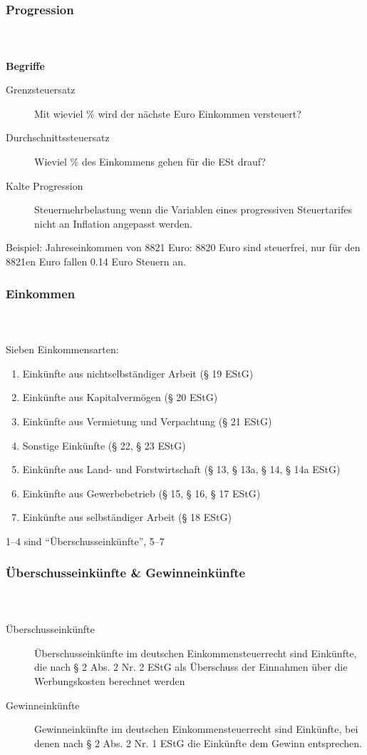 \documentclass[ngerman]{beamer}
\begin{document}
\begin{frame}
\frametitle{Progression}
\framesubtitle{~}

\textbf{Begriffe}

\begin{description}
\item[Grenzsteuersatz] Mit wieviel \% wird der nächste Euro Einkommen versteuert?
\item[Durchschnittssteuersatz] Wieviel \% des Einkommens gehen für die ESt drauf?
\item[Kalte Progression] Steuermehrbelastung wenn die Variablen eines progressiven Steuertarifes nicht an Inflation angepasst werden.
\end{description}

Beispiel: Jahreseinkommen von 8821 Euro: 8820 Euro sind steuerfrei, nur für den 8821en Euro fallen 0.14 Euro Steuern an.



\end{frame}

\begin{frame}
\frametitle{Einkommen}
\framesubtitle{~}

Sieben Einkommensarten:

\begin{enumerate}
\item Einkünfte aus nichtselbständiger Arbeit (§ 19 EStG)
\item Einkünfte aus Kapitalvermögen (§ 20 EStG)
\item Einkünfte aus Vermietung und Verpachtung (§ 21 EStG)
\item Sonstige Einkünfte (§ 22, § 23 EStG)
\item Einkünfte aus Land- und Forstwirtschaft (§ 13, § 13a, § 14, § 14a EStG)
\item Einkünfte aus Gewerbebetrieb (§ 15, § 16, § 17 EStG)
\item Einkünfte aus selbständiger Arbeit (§ 18 EStG)
\end{enumerate}

1--4 sind \enquote{Überschusseinkünfte}, 5--7 

\end{frame}

\begin{frame}
\frametitle{Überschusseinkünfte \& Gewinneinkünfte}
\framesubtitle{~}

\begin{description}
\item[Überschusseinkünfte] Überschusseinkünfte im deutschen Einkommensteuerrecht sind Einkünfte, die nach § 2 Abs. 2 Nr. 2 EStG als Überschuss der Einnahmen über die Werbungskosten berechnet werden
\item[Gewinneinkünfte] Gewinneinkünfte im deutschen Einkommensteuerrecht sind Einkünfte, bei denen nach § 2 Abs. 2 Nr. 1 EStG die Einkünfte dem Gewinn entsprechen. 
\end{description}

\end{frame}


\end{document}
